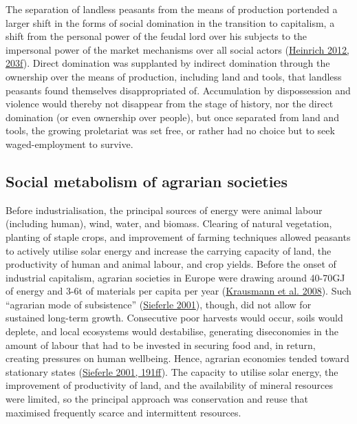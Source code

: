 \documentclass[a4paper, nobind]{templates/ociamthesis}
\begin{document}
The separation of landless peasants from the means of production portended a larger shift in the forms of social domination in the transition to capitalism, a shift from the personal power of the feudal lord over his subjects to the impersonal power of the market mechanisms over all social actors (\protect\hyperlink{ref-heinrich_introduction_2012}{Heinrich 2012, 203f}). Direct domination was supplanted by indirect domination through the ownership over the means of production, including land and tools, that landless peasants found themselves disappropriated of. Accumulation by dispossession and violence would thereby not disappear from the stage of history, nor the direct domination (or even ownership over people), but once separated from land and tools, the growing proletariat was set free, or rather had no choice but to seek waged-employment to survive.

\hypertarget{social-metabolism-of-agrarian-societies}{%
\subsection{Social metabolism of agrarian societies}\label{social-metabolism-of-agrarian-societies}}

Before industrialisation, the principal sources of energy were animal labour (including human), wind, water, and biomass. Clearing of natural vegetation, planting of staple crops, and improvement of farming techniques allowed peasants to actively utilise solar energy and increase the carrying capacity of land, the productivity of human and animal labour, and crop yields. Before the onset of industrial capitalism, agrarian societies in Europe were drawing around 40-70GJ of energy and 3-6t of materials per capita per year (\protect\hyperlink{ref-krausmann_global_2008}{Krausmann et al. 2008}). Such ``agrarian mode of subsistence'' (\protect\hyperlink{ref-sieferle_subterranean_2001}{Sieferle 2001}), though, did not allow for sustained long-term growth. Consecutive poor harvests would occur, soils would deplete, and local ecosystems would destabilise, generating diseconomies in the amount of labour that had to be invested in securing food and, in return, creating pressures on human wellbeing. Hence, agrarian economies tended toward stationary states (\protect\hyperlink{ref-sieferle_subterranean_2001}{Sieferle 2001, 191ff}). The capacity to utilise solar energy, the improvement of productivity of land, and the availability of mineral resources were limited, so the principal approach was conservation and reuse that maximised frequently scarce and intermittent resources.
\end{document}
